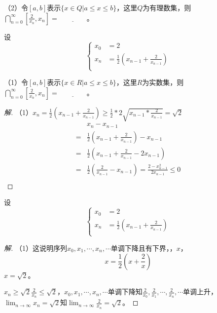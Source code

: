 \documentclass{beamer}
\begin{document}
\begin{CJK*}{UTF8}{gbsn}
\begin{frame}[t]
\begin{Exercise}
  （2）令$[a,b]$表示$\{x\in Q|a\leq x \leq b\}$，这里$Q$为有理数集，则$\bigcap_{n=0}^{\infty}[\frac{2}{x_n},x_n]=\underline{\quad\quad\quad\quad}$。
  \end{Exercise}
\end{frame}
\begin{frame}
  \begin{Exercise}
    设\[
    \begin{cases}
      x_0&=2\\
      x_n&=\frac{1}{2}(x_{n-1}+\frac{2}{x_{n-1}})\\
    \end{cases}
    \]
  \end{Exercise}
  （1）令$[a,b]$表示$\{x\in R|a\leq x \leq b\}$，这里$R$为实数集，则$\bigcap_{n=0}^{\infty}[\frac{2}{x_n},x_n]=\underline{\quad\quad\quad\quad}$。
  \pause
  \begin{proof}[解]\pause
   （1）$x_n=\frac{1}{2}(x_{n-1}+\frac{2}{x_{n-1}})\geq \frac{1}{2}*2\sqrt{x_{n-1}*\frac{2}{x_{n-1}}}=\sqrt{2}$\pause
    \begin{align*}
      &x_n-x_{n-1}\\
      =&\frac{1}{2}(x_{n-1}+\frac{2}{x_{n-1}})-x_{n-1}\\
      =&\frac{1}{2}(x_{n-1}+\frac{2}{x_{n-1}}-2x_{n-1})\\
      =&\frac{1}{2}(\frac{2}{x_{n-1}}-x_{n-1})=\frac{2-x_{n-1}^2}{2x_{n-1}}\leq 0\\
    \end{align*}
 \end{proof}  
\end{frame}
\begin{frame}[t]
  \begin{Exercise}
    设\[
    \begin{cases}
      x_0&=2\\
      x_n&=\frac{1}{2}(x_{n-1}+\frac{2}{x_{n-1}})\\
    \end{cases}
    \]
  \end{Exercise} 
\begin{proof}[解]\pause\justifying\let\raggedright\justifying
  （1）这说明序列$x_0,x_1,\cdots,x_n,\cdots$单调下降且有下界，，$x$，
  \[x=\frac{1}{2}(x+\frac{2}{x})\]
  $x=\sqrt{2}$。

  $x_n\geq \sqrt{2}$$\frac{2}{x_n}\leq \sqrt{2}$，$x_0,x_1,\cdots,x_n,\cdots$单调下降知$\frac{2}{x_0},\frac{2}{x_1},\cdots,\frac{2}{x_n},\cdots$单调上升，
$\lim_{n\to \infty}x_n=\sqrt{2}$知$\lim_{n\to \infty}\frac{2}{x_{n}}=\sqrt{2}$。


\end{proof}
\end{frame}
\end{CJK*}
\end{document}
